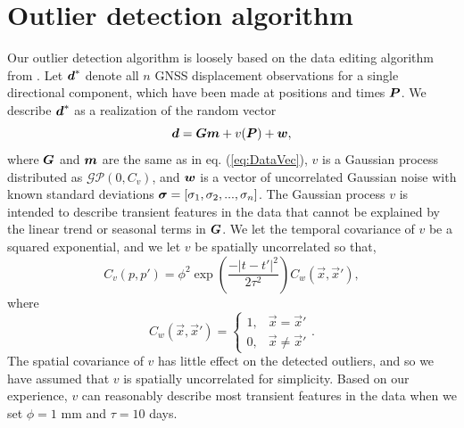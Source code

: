 \documentclass[extra,mreferee]{gji}
\begin{document}
\appendix

\section{Outlier detection algorithm}
Our outlier detection algorithm is loosely based on the data editing algorithm from \citet{Acheson1975}. Let $\mitbf{d}^*$ denote all $n$ GNSS displacement observations for a single directional component, which have been made at positions and times $\mitbf{P}$.  We describe $\mitbf{d}^*$ as a realization of the random vector 
\begin{equation}\label{eq:OutlierDataVec}
\mitbf{d} = \mitbf{G}\mitbf{m} + v(\mitbf{P}) + \mitbf{w},
\end{equation}
where $\mitbf{G}$ and $\mitbf{m}$ are the same as in eq. (\ref{eq:DataVec}), $v$ is a Gaussian process distributed as $\mathcal{GP}(0,C_v)$, and $\mitbf{w}$ is a vector of uncorrelated Gaussian noise with known standard deviations $\mitbf{\sigma} = [\sigma_1, \sigma_2, ..., \sigma_n]$. The Gaussian process $v$ is intended to describe transient features in the data that cannot be explained by the linear trend or seasonal terms in $\mitbf{G}$. We let the temporal covariance of $v$ be a squared exponential, and we let $v$ be spatially uncorrelated so that,
\begin{equation}
C_v(p,p') = \phi^2\exp\left(\frac{-|t - t'|^2}{2\tau^2}\right) C_w(\vec{x},\vec{x}'),
\end{equation}
where 
\begin{equation}\label{eq:WhiteCov}
C_w(\vec{x},\vec{x}') = 
\begin{cases}
1, &\vec{x} = \vec{x}' \\
0, &\vec{x} \neq \vec{x}'
\end{cases}.
\end{equation}
The spatial covariance of $v$ has little effect on the detected outliers, and so we have assumed that $v$ is spatially uncorrelated for simplicity. Based on our experience, $v$ can reasonably describe most transient features in the data when we set $\phi = 1$ mm and $\tau = 10$ days. 
\end{document}

